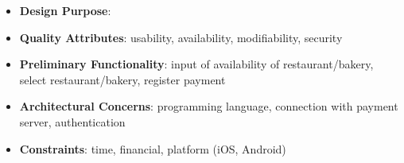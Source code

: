 \documentclass[pdftex, a4paper]{scrartcl}
\begin{document}
\begin{itemize}
    \item \textbf{Design Purpose}:
    \item \textbf{Quality Attributes}: usability, availability, modifiability, security
    \item \textbf{Preliminary Functionality}: input of availability of restaurant/bakery, select restaurant/bakery, 
    register payment
    \item \textbf{Architectural Concerns}: programming language, connection with payment server, authentication
    \item \textbf{Constraints}: time, financial, platform (iOS, Android)
\end{itemize}
\end{document}
